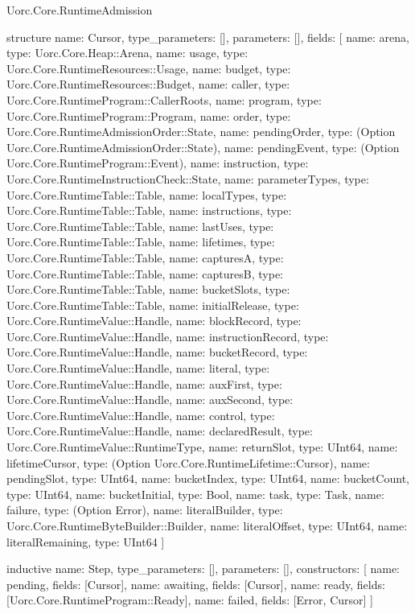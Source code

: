 \begin{lexlean}{Uorc.Core.RuntimeAdmission}
\begin{semanticmodule}
structure{
  name: Cursor,
  type_parameters: [],
  parameters: [],
  fields: [
    {name: arena, type: Uorc.Core.Heap::Arena},
    {name: usage, type: Uorc.Core.RuntimeResources::Usage},
    {name: budget, type: Uorc.Core.RuntimeResources::Budget},
    {name: caller, type: Uorc.Core.RuntimeProgram::CallerRoots},
    {name: program, type: Uorc.Core.RuntimeProgram::Program},
    {name: order, type: Uorc.Core.RuntimeAdmissionOrder::State},
    {name: pendingOrder, type: (Option Uorc.Core.RuntimeAdmissionOrder::State)},
    {name: pendingEvent, type: (Option Uorc.Core.RuntimeProgram::Event)},
    {name: instruction, type: Uorc.Core.RuntimeInstructionCheck::State},
    {name: parameterTypes, type: Uorc.Core.RuntimeTable::Table},
    {name: localTypes, type: Uorc.Core.RuntimeTable::Table},
    {name: instructions, type: Uorc.Core.RuntimeTable::Table},
    {name: lastUses, type: Uorc.Core.RuntimeTable::Table},
    {name: lifetimes, type: Uorc.Core.RuntimeTable::Table},
    {name: capturesA, type: Uorc.Core.RuntimeTable::Table},
    {name: capturesB, type: Uorc.Core.RuntimeTable::Table},
    {name: bucketSlots, type: Uorc.Core.RuntimeTable::Table},
    {name: initialRelease, type: Uorc.Core.RuntimeValue::Handle},
    {name: blockRecord, type: Uorc.Core.RuntimeValue::Handle},
    {name: instructionRecord, type: Uorc.Core.RuntimeValue::Handle},
    {name: bucketRecord, type: Uorc.Core.RuntimeValue::Handle},
    {name: literal, type: Uorc.Core.RuntimeValue::Handle},
    {name: auxFirst, type: Uorc.Core.RuntimeValue::Handle},
    {name: auxSecond, type: Uorc.Core.RuntimeValue::Handle},
    {name: control, type: Uorc.Core.RuntimeValue::Handle},
    {name: declaredResult, type: Uorc.Core.RuntimeValue::RuntimeType},
    {name: returnSlot, type: UInt64},
    {name: lifetimeCursor, type: (Option Uorc.Core.RuntimeLifetime::Cursor)},
    {name: pendingSlot, type: UInt64},
    {name: bucketIndex, type: UInt64},
    {name: bucketCount, type: UInt64},
    {name: bucketInitial, type: Bool},
    {name: task, type: Task},
    {name: failure, type: (Option Error)},
    {name: literalBuilder, type: Uorc.Core.RuntimeByteBuilder::Builder},
    {name: literalOffset, type: UInt64},
    {name: literalRemaining, type: UInt64}
  ]
}

inductive{
  name: Step,
  type_parameters: [],
  parameters: [],
  constructors: [
    {name: pending, fields: [Cursor]},
    {name: awaiting, fields: [Cursor]},
    {name: ready, fields: [Uorc.Core.RuntimeProgram::Ready]},
    {name: failed, fields: [Error, Cursor]}
  ]
}


\end{semanticmodule}
\end{lexlean}
